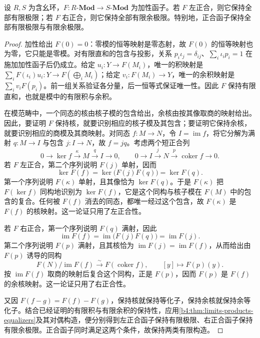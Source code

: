 \begin{proposition}[正合性与有限构造]\label{b4:prop:exact-preserves-finite}
	设 \(R,S\) 为含幺环，\(F:R\text{-}\mathbf{Mod}\rightarrow S\text{-}\mathbf{Mod}\) 为加性函子。若 \(F\) 左正合，则它保持全部有限极限；若 \(F\) 右正合，则它保持全部有限余极限。特别地，正合函子保持全部有限极限与有限余极限。
\end{proposition}
\begin{proof}
	加性给出 \(F(0)=0\)：零模的恒等映射是零态射，故 \(F(0)\) 的恒等映射也为零，它只能是零模。对有限直和的包含与投影，关系 \(p_i\iota_j=\delta_{ij}\)、\(\sum_i\iota_ip_i=1\) 在施加加性函子后仍成立。给定 \(u_i:Y\to F(M_i)\)，唯一的积映射是 \(\sum_iF(\iota_i)u_i:Y\to F(\bigoplus_iM_i)\)；给定 \(v_i:F(M_i)\to Y\)，唯一的余积映射是 \(\sum_iv_iF(p_i)\)。前一组关系验证各分量，后一恒等式保证唯一性。因此 \(F\) 保持有限直和，也就是模中的有限积与余积。

	在模范畴中，一个同态的核由核子模的包含给出，余核由按其像取商的映射给出。因此，要证明 \(F\) 保持核，就要识别相应的核子模及其包含；要证明它保持余核，就要识别相应的商模及其商映射。对同态 \(f:M\rightarrow N\)，令 \(I=\operatorname{im}f\)，将它分解为满射 \(q:M\rightarrow I\) 与包含 \(j:I\rightarrow N\)，故 \(f=jq\)。考虑两个短正合列
	\[
		0\longrightarrow\ker f\xrightarrow{\kappa}M \xrightarrow{q}I\longrightarrow0, \qquad 0\longrightarrow I\xrightarrow{j}N \xrightarrow{p}\operatorname{coker}f\longrightarrow0.
	\]
	若 \(F\) 左正合，第二个序列说明 \(F(j)\) 单射，因而
	\[
		\ker F(f)=\ker\bigl(F(j)F(q)\bigr)=\ker F(q).
	\]
	第一个序列说明 \(F(\kappa)\) 单射，且其像恰为 \(\ker F(q)\)。于是 \(F(\kappa)\) 把 \(F(\ker f)\) 同构地识别为 \(\ker F(f)\)，它是这个同构与核子模在 \(F(M)\) 中的包含的复合。任何被 \(F(f)\) 消去的同态，都唯一经过这个包含，故 \(F(\kappa)\) 是 \(F(f)\) 的核映射。这一论证只用了左正合性。

	若 \(F\) 右正合，第一个序列说明 \(F(q)\) 满射，因此
	\[
		\operatorname{im}F(f)=\operatorname{im}\bigl(F(j)F(q)\bigr) =\operatorname{im}F(j).
	\]
	第二个序列说明 \(F(p)\) 满射，且其核恰为 \(\operatorname{im}F(j)=\operatorname{im}F(f)\)，从而给出由 \(F(p)\) 诱导的同构
	\[
		F(N)/\operatorname{im}F(f)\xrightarrow{\sim}F(\operatorname{coker}f), \qquad [y]\longmapsto F(p)(y).
	\]
	按 \(\operatorname{im}F(f)\) 取商的映射后复合这个同构，正是 \(F(p)\)，因而 \(F(p)\) 是 \(F(f)\) 的余核映射。这一论证只用了右正合性。

	又因 \(F(f-g)=F(f)-F(g)\)，保持核就保持等化子，保持余核就保持余等化子。结合已经证明的有限积与有限余积的保持性，应用\cref{b4:thm:limits-products-equalizers}及其对偶构造，便分别得到左正合函子保持有限极限、右正合函子保持有限余极限。正合函子同时满足这两个条件，故保持两类有限构造。
\end{proof}

